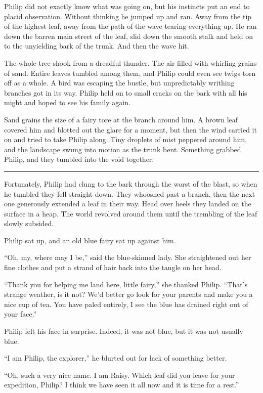 \documentclass[10pt]{memoir}
\renewcommand{\pfbreakdisplay}{\bigskip \ding{166} \bigskip}
\newcommand{\secbreak}{\fancybreak{\pfbreakdisplay}}
\begin{document}
Philip did not exactly know what was going on, but his instincts put an end to
placid observation. Without thinking he jumped up and ran. Away from the tip of
the highest leaf, away from the path of the wave tearing everything up. He ran
down the barren main street of the leaf, slid down the smooth stalk and held on
to the unyielding bark of the trunk. And then the wave hit.

The whole tree shook from a dreadful thunder. The air filled with whirling
grains of sand. Entire leaves tumbled among them, and Philip could even see
twigs torn off as a whole. A bird was escaping the bustle, but unpredictably
writhing branches got in its way. Philip held on to small cracks on the bark
with all his might and hoped to see his family again.

Sand grains the size of a fairy tore at the branch around him. A brown leaf
covered him and blotted out the glare for a moment, but then the wind carried
it on and tried to take Philip along. Tiny droplets of mist peppered around
him, and the landscape swung into motion as the trunk bent. Something grabbed
Philip, and they tumbled into the void together.

\secbreak

Fortunately, Philip had clung to the bark through the worst of the blast, so
when he tumbled they fell straight down. They whooshed past a branch, then the
next one generously extended a leaf in their way. Head over heels they landed
on the surface in a heap. The world revolved around them until the trembling of
the leaf slowly subsided.

Philip sat up, and an old blue fairy sat up against him.

``Oh, my, where may I be,'' said the blue-skinned lady. She straightened out
her fine clothes and put a strand of hair back into the tangle on her head.

``Thank you for helping me land here, little fairy,'' she thanked Philip.
``That's strange weather, is it not? We'd better go look for your parents and
make you a nice cup of tea. You have paled entirely, I see the blue has drained
right out of your face.''

Philip felt his face in surprise. Indeed, it was not blue, but it was not
usually blue.

``I am Philip, the explorer,'' he blurted out for lack of something better.

``Oh, such a very nice name. I am Raisy. Which leaf did you leave for your
expedition, Philip? I think we have seen it all now and it is time for a
rest.''
\end{document}
